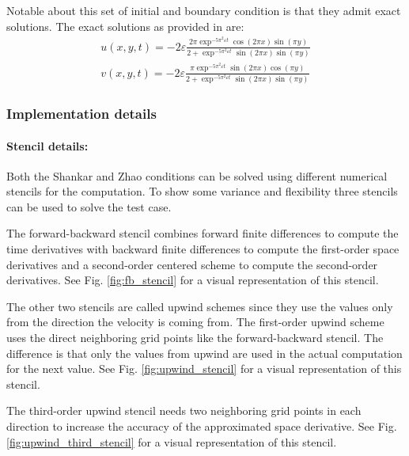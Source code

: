Notable about this set of initial and boundary condition is that they admit exact solutions.
The exact solutions as provided in \citet{zhao2011new} are:
\\
\begin{equation}
\label{eq:exact_solution}
\begin{split}
u\left(x,y,t\right) = -2\varepsilon \frac{2 \pi \exp^{-5 \pi^2 \varepsilon t} \cos\left(2 \pi x\right) \sin\left(\pi y\right)}{2 + \exp^{-5 \pi^2 \varepsilon t}\sin\left(2 \pi x\right) \sin\left(\pi y\right)}
\\
v\left(x,y,t\right) = -2\varepsilon \frac{\pi \exp^{-5 \pi^2 \varepsilon t} \sin\left(2 \pi x\right) \cos\left(\pi y\right)}{2 + \exp^{-5 \pi^2 \varepsilon t}\sin\left(2 \pi x\right) \sin\left(\pi y\right)}
\end{split}
\end{equation}

\subsubsection{Implementation details}
\paragraph{Stencil details: }
Both the Shankar and Zhao conditions can be solved using different numerical stencils for the computation.
To show some variance and flexibility three stencils can be used to solve the test case.

The forward-backward stencil combines forward finite differences to compute the time derivatives with backward finite differences to compute the first-order space derivatives and a second-order centered scheme to compute the second-order derivatives.
See Fig. \ref{fig:fb_stencil} for a visual representation of this stencil.

The other two stencils are called upwind schemes since they use the values only from the direction the velocity is coming from.
The first-order upwind scheme uses the direct neighboring grid points like the forward-backward stencil.
The difference is that only the values from upwind are used in the actual computation for the next value.
See Fig. \ref{fig:upwind_stencil} for a visual representation of this stencil.

The third-order upwind stencil needs two neighboring grid points in each direction to increase the accuracy of the approximated space derivative.
See Fig. \ref{fig:upwind_third_stencil} for a visual representation of this stencil.

